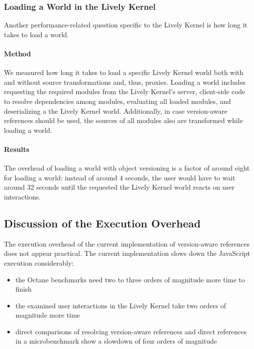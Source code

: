 \subsubsection{Loading a World in the Lively Kernel}

Another performance-related question specific to the Lively Kernel is how long it takes to load a world.

\paragraph{Method}
We measured how long it takes to load a specific Lively Kernel world both with and without source transformations and, thus, proxies.
Loading a world includes requesting the required modules from the Lively Kernel's server, client-side code to resolve dependencies among modules, evaluating all loaded modules, and deserializing a the Lively Kernel world.
Additionally, in case version-aware references should be used, the sources of all modules also are transformed while loading a world.

\paragraph{Results}
The overhead of loading a world with object versioning is a factor of around eight for loading a world: instead of around 4 seconds, the user would have to wait around 32 seconds until the requested the Lively Kernel world reacts on user interactions.




\subsection{Discussion of the Execution Overhead}

The execution overhead of the current implementation of version-aware references does not appear practical.
The current implementation slows down the JavaScript execution considerably: 

\begin{itemize}
    \item the Octane benchmarks need two to three orders of magnitude more time to finish
    \item the examined user interactions in the Lively Kernel take two orders of magnitude more time
    \item direct comparisons of resolving version-aware references and direct references in a microbenchmark show a slowdown of four orders of magnitude
\end{itemize}

